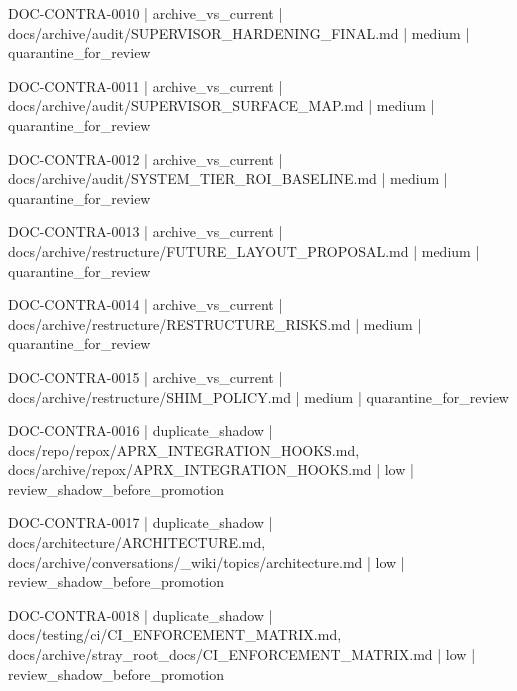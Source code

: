 \documentclass[11pt,a4paper]{report}
\begin{document}
{\small\ttfamily\raggedright DOC-\allowbreak{}CONTRA-\allowbreak{}0010 | archive\_vs\_current | docs/\allowbreak{}archive/\allowbreak{}audit/\allowbreak{}SUPERVISOR\_HARDENING\_FINAL.\allowbreak{}md | medium | quarantine\_for\_review\par}
{\small\ttfamily\raggedright DOC-\allowbreak{}CONTRA-\allowbreak{}0011 | archive\_vs\_current | docs/\allowbreak{}archive/\allowbreak{}audit/\allowbreak{}SUPERVISOR\_SURFACE\_MAP.\allowbreak{}md | medium | quarantine\_for\_review\par}
{\small\ttfamily\raggedright DOC-\allowbreak{}CONTRA-\allowbreak{}0012 | archive\_vs\_current | docs/\allowbreak{}archive/\allowbreak{}audit/\allowbreak{}SYSTEM\_TIER\_ROI\_BASELINE.\allowbreak{}md | medium | quarantine\_for\_review\par}
{\small\ttfamily\raggedright DOC-\allowbreak{}CONTRA-\allowbreak{}0013 | archive\_vs\_current | docs/\allowbreak{}archive/\allowbreak{}restructure/\allowbreak{}FUTURE\_LAYOUT\_PROPOSAL.\allowbreak{}md | medium | quarantine\_for\_review\par}
{\small\ttfamily\raggedright DOC-\allowbreak{}CONTRA-\allowbreak{}0014 | archive\_vs\_current | docs/\allowbreak{}archive/\allowbreak{}restructure/\allowbreak{}RESTRUCTURE\_RISKS.\allowbreak{}md | medium | quarantine\_for\_review\par}
{\small\ttfamily\raggedright DOC-\allowbreak{}CONTRA-\allowbreak{}0015 | archive\_vs\_current | docs/\allowbreak{}archive/\allowbreak{}restructure/\allowbreak{}SHIM\_POLICY.\allowbreak{}md | medium | quarantine\_for\_review\par}
{\small\ttfamily\raggedright DOC-\allowbreak{}CONTRA-\allowbreak{}0016 | duplicate\_shadow | docs/\allowbreak{}repo/\allowbreak{}repox/\allowbreak{}APRX\_INTEGRATION\_HOOKS.\allowbreak{}md, docs/\allowbreak{}archive/\allowbreak{}repox/\allowbreak{}APRX\_INTEGRATION\_HOOKS.\allowbreak{}md | low | review\_shadow\_before\_promotion\par}
{\small\ttfamily\raggedright DOC-\allowbreak{}CONTRA-\allowbreak{}0017 | duplicate\_shadow | docs/\allowbreak{}architecture/\allowbreak{}ARCHITECTURE.\allowbreak{}md, docs/\allowbreak{}archive/\allowbreak{}conversations/\allowbreak{}\_wiki/\allowbreak{}topics/\allowbreak{}architecture.\allowbreak{}md | low | review\_shadow\_before\_promotion\par}
{\small\ttfamily\raggedright DOC-\allowbreak{}CONTRA-\allowbreak{}0018 | duplicate\_shadow | docs/\allowbreak{}testing/\allowbreak{}ci/\allowbreak{}CI\_ENFORCEMENT\_MATRIX.\allowbreak{}md, docs/\allowbreak{}archive/\allowbreak{}stray\_root\_docs/\allowbreak{}CI\_ENFORCEMENT\_MATRIX.\allowbreak{}md | low | review\_shadow\_before\_promotion\par}
\end{document}
